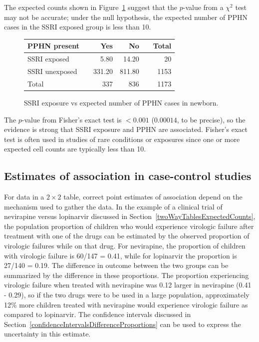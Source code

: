 The expected counts shown in Figure~\ref{ssriPPHNExpected} suggest that the $p$-value from a $\chi^2$ test may not be accurate; under the null hypothesis, the expected number of PPHN cases in the SSRI exposed group is less than 10.

 \begin{figure}[h]
	\centering
	\begin{tabular}{ll rrr r}
		\hline
		PPHN present  & \hspace{2mm} & Yes & No & \hspace{2mm} & Total \\
		\hline
		SSRI exposed &	& 5.80 & 14.20 &  & 20  \\
		SSRI unexposed & & 331.20 & 811.80 &  & 1153  \\
        Total & & 337 & 836 & & 1173 \\
		\hline
	\end{tabular}
    \caption{SSRI exposure vs expected number of PPHN cases in newborn.}
    \label{ssriPPHNExpected}
\end{figure}

The $p$-value from Fisher's exact test is $< 0.001$ ($0.00014$, to be precise), so the evidence is strong that SSRI exposure and PPHN are associated. Fisher's exact test is often used in studies of rare conditions or exposures since one or more expected cell counts are typically less than 10.



\textD{\newpage}


\subsection{Estimates of association in case-control studies}
\label{caseControlStudiesEstimates}


For data in a $2 \times 2$ table, correct point estimates of association depend on the mechanism used to gather the data.  In the example of a clinical trial of nevirapine versus lopinarvir discussed in Section~\ref{twoWayTablesExpectedCounts}, the population proportion of children who would experience virologic failure after treatment with one of the drugs can be estimated by the observed proportion of virologic failures while on that drug. For nevirapine, the proportion of children with virologic failure is 60/147 = 0.41, while for lopinarvir the proportion is 27/140 = 0.19.  The difference in outcome between the two groups can be summarized by the difference in these proportions. The proportion experiencing virologic failure when treated with nevirapine was 0.12 larger in nevirapine (0.41 - 0.29), so if the two drugs were to be used in a large population, approximately 12\% more children treated with nevirapine would experience virologic failure as compared to lopinarvir. The confidence intervals discussed in Section~\ref{confidenceIntervalsDifferenceProportions} can be used to express the uncertainty in this estimate.


